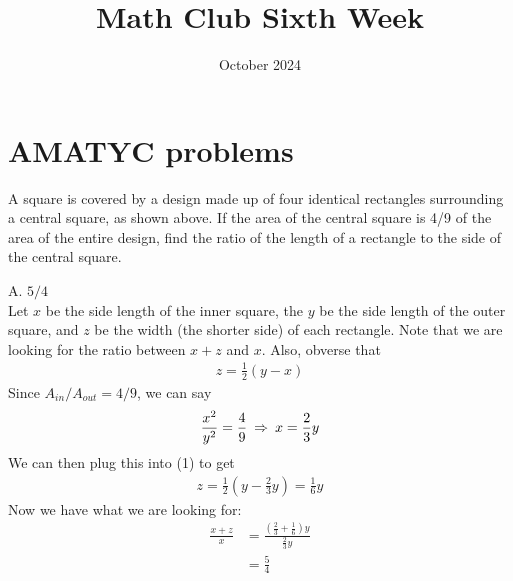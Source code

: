 \documentclass[12pt]{article}
\title{Math Club Sixth Week}
\date{October 2024}
\newcounter{problem}
\begin{document}
\sloppy
\maketitle

\section*{AMATYC problems}

\begin{problem}
   A square is covered by a design made up of four identical rectangles
   surrounding a central square, as shown above. If the area of the
   central square is 4/9 of the area of the entire design, find the ratio of the length of a rectangle to the side of the central square. 
   \begin{center}
      \end{center}
\end{problem}

\begin{solution}
      A. $5/4$ \\
      Let $x$ be the side length of the inner square, the $y$ be the side length of the outer square, and $z$ be the width (the shorter side) of each rectangle. Note that we are looking for the ratio between $x+z$ and $x$. Also, obverse that
      \begin{align}
         z=\frac{1}{2}(y-x)
      \end{align}
      Since $A_{in}/A_{out}=4/9$, we can say 
      \begin{align} \setcounter{equation}{1}
         \frac{x^2}{y^2} = \frac{4}{9} \: \Rightarrow \: x = \frac{2}{3}y
      \end{align}
      We can then plug this into (1) to get 
      \begin{align*}
         z = \frac{1}{2}(y-\frac{2}{3}y) = \frac{1}{6}y
      \end{align*}
      Now we have what we are looking for: 
      \begin{align*}
         \frac{x+z}{x} &= \frac{(\frac{2}{3}+\frac{1}{6})y}{\frac{2}{3}y} \\
         &= \boxed{\frac{5}{4}}
      \end{align*}
\end{solution}
\end{document}

